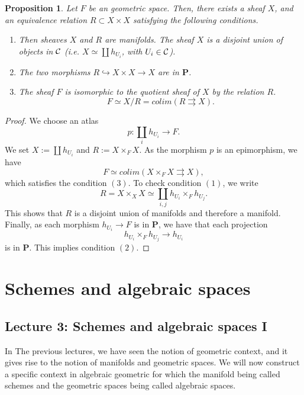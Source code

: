 \documentclass{tufte-book} %
\numberwithin{dummy}{section}
\newtheorem{prop}[thm]{Proposition}
\newcommand{\calc}{{\cal C}}
\newcommand{\lrta}{\longrightarrow}
\newcommand{\inj}{\hookrightarrow}
\newcommand{\bfp}{\mathbf{P}}
\begin{document}
\begin{prop}
Let $F$ be an geometric space. Then, there exists a sheaf $X$, and an equivalence relation $R\subset X\times X$ satisfying the following conditions.
\begin{enumerate}
\item Then sheaves $X$ and $R$ are manifolds. The sheaf $X$ is a disjoint union of objects in $\calc$ (i.e. $X\simeq \coprod h_{U_i}$, with $U_i\in \calc$).
\item The two morphisms $R\inj X\times X\lrta X$ are in $\bfp$.
\item The sheaf $F$ is isomorphic to the quotient sheaf of $X$ by the relation $R$.
$$
F\simeq X/R=colim(R\rightrightarrows X).
$$
\end{enumerate}
\end{prop}
\begin{proof}
We choose an atlas
$$
p:\coprod_i h_{U_i}\lrta F.
$$
We set $X:=\coprod h_{U_i}$ and $R:=X\times_F X$. As the morphism $p$ is an epimorphism, we have
$$
F\simeq colim(X\times_F X\rightrightarrows X),
$$
which satisfies the condition $(3)$. To check condition $(1)$, we write
$$
R=X\times_X X\simeq \coprod_{i,j}h_{U_i}\times_F h_{U_j}.
$$
This shows that $R$ is a disjoint union of manifolds and therefore a manifold. Finally, as each morphism $h_{U_i}\lrta F$ is in $\bfp$, we have that each projection
$$
h_{U_i}\times_F h_{U_j}\lrta h_{U_i}
$$
is in $\bfp$. This implies condition $(2)$.
\end{proof}
\chapter{Schemes and algebraic spaces}
\section{Lecture 3: Schemes and algebraic spaces I}
In The previous lectures, we have seen the notion of geometric context, and it gives rise to the notion of manifolds and geometric spaces. We will now construct a specific context in algebraic geometric for which the manifold being called schemes and the geometric spaces being called algebraic spaces.
\end{document}
